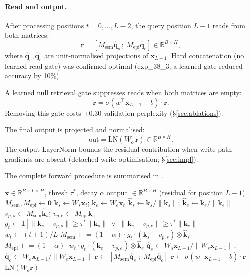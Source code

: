 \documentclass{article}
\newcommand{\Msem}{M_{\mathrm{sem}}}
\newcommand{\Mepi}{M_{\mathrm{epi}}}
\newcommand{\ks}{\mathbf{k}_s}
\newcommand{\ke}{\mathbf{k}_e}
\newcommand{\ksnorm}{\hat{\mathbf{k}}_s}
\newcommand{\kenorm}{\hat{\mathbf{k}}_e}
\newcommand{\vps}{v_{p,s}}
\newcommand{\vpe}{v_{p,e}}
\newcommand{\bx}{\mathbf{x}}
\newcommand{\br}{\mathbf{r}}
\newcommand{\bq}{\mathbf{q}}
\begin{document}
\paragraph{Read and output.}
After processing positions $t = 0, \ldots, L-2$, the query position $L-1$ reads from
both matrices:
\begin{equation}
  \br = \left[\Msem \hat{\mathbf{q}}_s \,;\, \Mepi \hat{\mathbf{q}}_e\right]
  \in \mathbb{R}^{B \times H},
  \label{eq:read}
\end{equation}
where $\hat{\mathbf{q}}_s, \hat{\mathbf{q}}_e$ are unit-normalised projections of
$\bx_{L-1}$.  Hard concatenation (no learned read gate) was confirmed optimal (exp\_38\_3;
a learned gate reduced accuracy by 10\%).

A learned null retrieval gate suppresses reads when both matrices are empty:
\begin{equation}
  \tilde{\br} = \sigma\!\left(w^\top \bx_{L-1} + b\right) \cdot \br.
  \label{eq:null-gate}
\end{equation}
Removing this gate costs $+0.30$ validation perplexity (\S\ref{sec:ablations}).

The final output is projected and normalised:
\begin{equation}
  \mathrm{out} = \mathrm{LN}\!\left(W_o \,\tilde{\br}\right) \in \mathbb{R}^{B \times H}.
  \label{eq:output}
\end{equation}
The output LayerNorm bounds the residual contribution when write-path gradients are
absent (detached write optimisation; \S\ref{sec:impl}).

The complete forward procedure is summarised in .

\begin{algorithm}[t]
  \caption{L4 MemoryModule forward pass}
  \label{alg:memory}
  \begin{algorithmic}[1]
    \Require $\bx \in \mathbb{R}^{B \times L \times H}$, thresh $\tau^*$, decay $\alpha$
    \Ensure output $\in \mathbb{R}^{B \times H}$ (residual for position $L-1$)
    \State $\Msem, \Mepi \leftarrow \mathbf{0}$  
      \State $\ks \leftarrow W_s\bx_t$; $\ke \leftarrow W_e\bx_t$
      \State $\ksnorm \leftarrow \ks/\|\ks\|$; $\kenorm \leftarrow \ke/\|\ke\|$
      \State $\vps \leftarrow \Msem\ksnorm$; $\vpe \leftarrow \Mepi\kenorm$
      \State $g_t \leftarrow \mathbf{1}[\|\ks-\vps\|\geq\tau^*\|\ks\|
             \;\vee\; \|\ke-\vpe\|\geq\tau^*\|\ke\|]$
      \State $w_t \leftarrow (t+1)/L$
      \State $\Msem \mathrel{+}= (1-\alpha)\cdot g_t\cdot(\ks-\vps)\otimes\ksnorm$
      \State $\Mepi \mathrel{+}= (1-\alpha)\cdot w_t\cdot g_t\cdot(\ke-\vpe)\otimes\kenorm$
    \EndFor
    \State $\hat{\bq}_s \leftarrow W_s\bx_{L-1}/\|W_s\bx_{L-1}\|$;
           $\hat{\bq}_e \leftarrow W_e\bx_{L-1}/\|W_e\bx_{L-1}\|$
    \State $\br \leftarrow [\Msem\hat{\bq}_s\;;\;\Mepi\hat{\bq}_e]$
    \State $\br \leftarrow \sigma(w^\top\bx_{L-1}+b)\cdot\br$ 
    \State \Return $\mathrm{LN}(W_o\br)$
  \end{algorithmic}
\end{algorithm}
\end{document}
